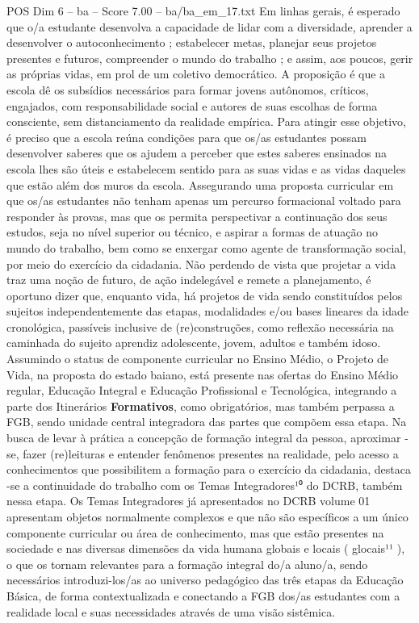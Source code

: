 \begin{textsample}{POS Dim 6 – ba – Score 7.00 – ba/ba\_em\_17.txt}
Em linhas gerais, é esperado que o/a estudante desenvolva a capacidade de lidar com a diversidade, aprender a desenvolver o autoconhecimento ; estabelecer metas, planejar seus projetos presentes e futuros, compreender o mundo do trabalho ; e assim, aos poucos, gerir as próprias vidas, em prol de um coletivo democrático.
A proposição é que a escola dê os subsídios necessários para formar jovens autônomos, críticos, engajados, com responsabilidade social e autores de suas escolhas de forma consciente, sem distanciamento da realidade empírica.
Para atingir esse objetivo, é preciso que a escola reúna condições para que os/as estudantes possam desenvolver saberes que os ajudem a perceber que estes saberes ensinados na escola lhes são úteis e estabelecem sentido para as suas vidas e as vidas daqueles que estão além dos muros da escola.
Assegurando uma proposta curricular em que os/as estudantes não tenham apenas um percurso formacional voltado para responder às provas, mas que os permita perspectivar a continuação dos seus estudos, seja no nível superior ou técnico, e aspirar a formas de atuação no mundo do trabalho, bem como se enxergar como agente de transformação social, por meio do exercício da cidadania.
Não perdendo de vista que projetar a vida traz uma noção de futuro, de ação indelegável e remete a planejamento, é oportuno dizer que, enquanto vida, há projetos de vida sendo constituídos pelos sujeitos independentemente das etapas, modalidades e/ou bases lineares da idade cronológica, passíveis inclusive de (re)construções, como reflexão necessária na caminhada do sujeito aprendiz adolescente, jovem, adultos e também idoso.
Assumindo o status de componente curricular no Ensino Médio, o Projeto de Vida, na proposta do estado baiano, está presente nas ofertas do Ensino Médio regular, Educação Integral e Educação Profissional e Tecnológica, integrando a parte dos Itinerários \textbf{Formativos}, como obrigatórios, mas também perpassa a FGB, sendo unidade central integradora das partes que compõem essa etapa.
Na busca de levar à prática a concepção de formação integral da pessoa, aproximar -se, fazer (re)leituras e entender fenômenos presentes na realidade, pelo acesso a conhecimentos que possibilitem a formação para o exercício da cidadania, destaca -se a continuidade do trabalho com os Temas Integradores¹⁰ do DCRB, também nessa etapa.
Os Temas Integradores já apresentados no DCRB volume 01 apresentam objetos normalmente complexos e que não são específicos a um único componente curricular ou área de conhecimento, mas que estão presentes na sociedade e nas diversas dimensões da vida humana globais e locais ( glocais¹¹ ), o que os tornam relevantes para a formação integral do/a aluno/a, sendo necessários introduzi-los/as ao universo pedagógico das três etapas da Educação Básica, de forma contextualizada e conectando a FGB dos/as estudantes com a realidade local e suas necessidades através de uma visão sistêmica.

\end{textsample}
